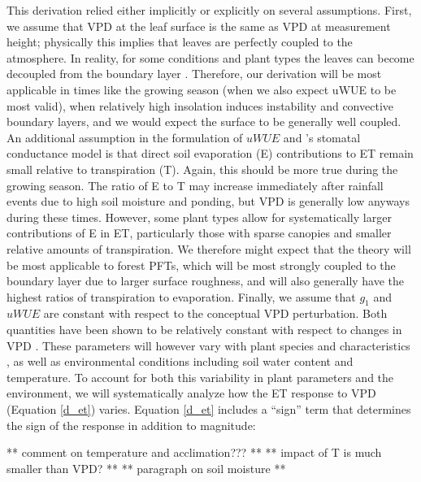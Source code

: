   This derivation relied either implicitly or explicitly on several
  assumptions. First, we assume that VPD at the leaf surface is the
  same as VPD at measurement height; physically this implies that
  leaves are perfectly coupled to the atmosphere. In reality, for some
  conditions and plant types the leaves can become decoupled from the
  boundary layer \citep{De_2017, Medlyn_2017}. Therefore, our
  derivation will be most applicable in times like the growing season
  (when we also expect uWUE to be most valid), when relatively high
  insolation induces instability and convective boundary layers, and
  we would expect the surface to be generally well coupled. An
  additional assumption in the formulation of $uWUE$ \citep{Zhou_2014,
    Zhou_2015} and \citet{Medlyn_2017}'s stomatal conductance model is
  that direct soil evaporation (E) contributions to ET remain small
  relative to transpiration (T). Again, this should be more true
  during the growing season. The ratio of E to T may increase
  immediately after rainfall events due to high soil moisture and
  ponding, but VPD is generally low anyways during these
  times. However, some plant types allow for systematically larger
  contributions of E in ET, particularly those with sparse canopies
  and smaller relative amounts of transpiration. We therefore might
  expect that the theory will be most applicable to forest PFTs, which
  will be most strongly coupled to the boundary layer due to larger
  surface roughness, and will also generally have the highest ratios
  of transpiration to evaporation. Finally, we assume that $g_1$ and
  $uWUE$ are constant with respect to the conceptual VPD
  perturbation. Both quantities have been shown to be relatively
  constant with respect to changes in
  VPD \citep{Franks_2017, Zhou_2014}. These parameters will however
  vary with plant species and characteristics \citep[e.g. wood density,
  ][]{Lin_2015}, as well as environmental conditions including soil
  water content and temperature.
  To account for both this variability in plant parameters and the
  environment, we will systematically analyze how the ET response to
  VPD (Equation \ref{d_et}) varies. Equation \ref{d_et} includes a
  ``sign'' term that determines the sign of the response in addition
  to magnitude:

  ** comment on temperature and acclimation??? **
  ** impact of T is much smaller than VPD? **
  ** paragraph on soil moisture **

